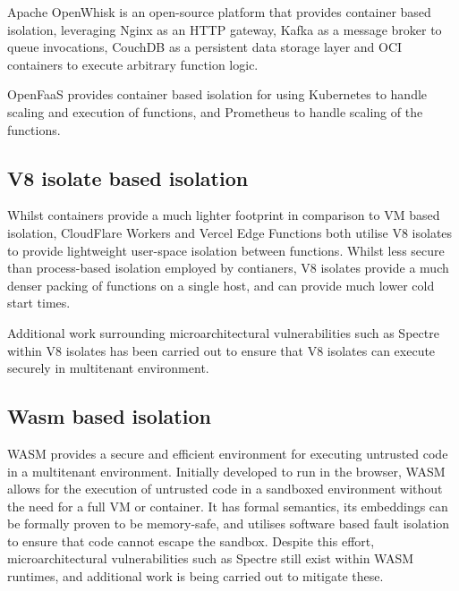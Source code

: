 Apache OpenWhisk\cite{apacheOpenWhisk2024} is an open-source \faas{} platform that provides container based isolation, leveraging Nginx as an HTTP gateway, Kafka as a message broker to queue invocations, CouchDB as a persistent data storage layer and OCI containers to execute arbitrary function logic.

OpenFaaS\cite{ellisOpenFaaS2024} provides container based isolation for \faas{} using Kubernetes to handle scaling and execution of functions, and Prometheus to handle scaling of the functions.

\subsection{V8 isolate based isolation}
Whilst containers provide a much lighter footprint in comparison to VM based isolation, CloudFlare Workers\cite{CloudComputingContainers2018} and Vercel Edge Functions\cite{EdgeRuntime} both utilise V8 isolates to provide lightweight user-space isolation between functions. Whilst less secure than process-based isolation employed by contianers, V8 isolates provide a much denser packing of functions on a single host, and can provide much lower cold start times.

Additional work surrounding microarchitectural vulnerabilities such as Spectre within V8 isolates has been carried out to ensure that V8 isolates can execute securely in multitenant environment\cite{schwarzlRobustScalableProcess2022}.

\subsection{Wasm based isolation}
WASM provides a secure and efficient environment for executing untrusted code\cite{WebAssembly} in a multitenant environment. Initially developed to run in the browser, WASM allows for the execution of untrusted code in a sandboxed environment without the need for a full VM or container. It has formal semantics\cite{haasBringingWebSpeed2017}, its embeddings can be formally proven to be memory-safe\cite{SecurefoundationsVWasm2024}, and utilises software based fault isolation to ensure that code cannot escape the sandbox\cite{SecurityWebAssembly}. Despite this effort, microarchitectural vulnerabilities such as Spectre still exist within WASM runtimes, and additional work is being carried out to mitigate these\cite{narayanSwivelHardeningWebAssembly2021}.

